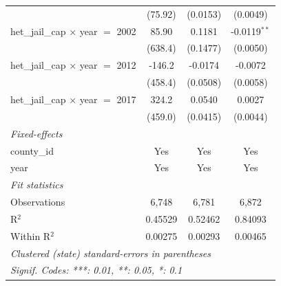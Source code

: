 \begin{tabular}{lccc}
                                                        & (75.92)                          & (0.0153)                     & (0.0049)\\   
   het\_jail\_cap $\times$ year $=$ 2002                & 85.90                            & 0.1181                       & -0.0119$^{**}$\\   
                                                        & (638.4)                          & (0.1477)                     & (0.0050)\\   
   het\_jail\_cap $\times$ year $=$ 2012                & -146.2                           & -0.0174                      & -0.0072\\   
                                                        & (458.4)                          & (0.0508)                     & (0.0058)\\   
   het\_jail\_cap $\times$ year $=$ 2017                & 324.2                            & 0.0540                       & 0.0027\\   
                                                        & (459.0)                          & (0.0415)                     & (0.0044)\\   
   \midrule
   \emph{Fixed-effects}\\
   county\_id                                           & Yes                              & Yes                          & Yes\\  
   year                                                 & Yes                              & Yes                          & Yes\\  
   \midrule
   \emph{Fit statistics}\\
   Observations                                         & 6,748                            & 6,781                        & 6,872\\  
   R$^2$                                                & 0.45529                          & 0.52462                      & 0.84093\\  
   Within R$^2$                                         & 0.00275                          & 0.00293                      & 0.00465\\  
   \midrule \midrule
   \multicolumn{4}{l}{\emph{Clustered (state) standard-errors in parentheses}}\\
   \multicolumn{4}{l}{\emph{Signif. Codes: ***: 0.01, **: 0.05, *: 0.1}}\\
\end{tabular}
\par\endgroup



